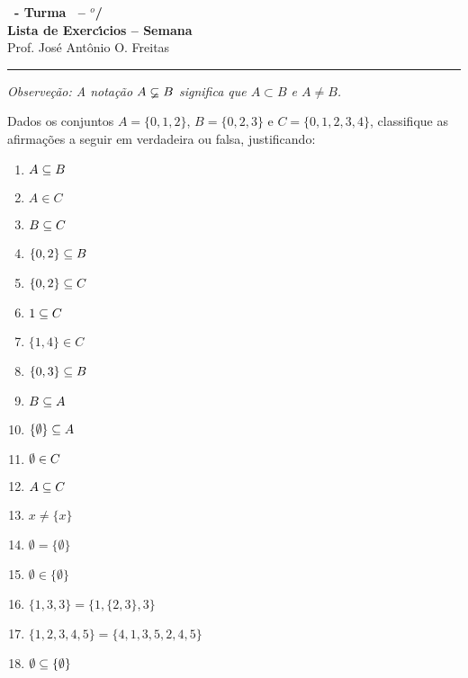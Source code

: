 \documentclass[12pt]{exam}
\begin{document}
    \begin{center}
    {\Large\bf \disciplina\ - Turma \turma\ -- \semestre$^{o}$/\ano} \\ \vspace{9pt} {\large\bf
        Lista de Exerc{\'\i}cios -- Semana \numerosemana}\\ \vspace{9pt} Prof. Jos{\'e} Ant{\^o}nio O. Freitas
    \end{center}
    \hrule

    \vspace{.6cm}

    \begin{center}
        \textit{Observeção: A notação $A \varsubsetneq B$ significa que $A \subset B$ e $A \ne B$.}
    \end{center}
    \questao{} Dados os conjuntos $A = \{0,1,2\}$, $B = \{0,2,3\}$ e $C = \{0,1,2,3,4\}$, classifique as afirma\c{c}\~oes a seguir em verdadeira ou falsa, justificando:
    \begin{multicols}{2}
        \begin{enumerate}[label={\alph*})]
            \item $A \subseteq B$
            \item $A \in C$
            \item $B \subseteq C$
            \item $\{0,2\} \subseteq B$
            \item $\{0,2\} \subseteq C$
            \item $1 \subseteq C$
            \item $\{1,4\} \in C$
            \item $\{0,3\} \subseteq B$
            \item $B \subseteq A$
            \item $\{\emptyset\} \subseteq A$
            \item $\emptyset \in C$
            \item $A \subseteq C$
            \item $x \neq \{x\}$
            \item $\emptyset = \{\emptyset\}$
            \item $\emptyset \in \{\emptyset\}$
            \item $\{1, 3, 3\} = \{1, \{2, 3\}, 3\}$
            \item $\{1, 2, 3, 4, 5\} = \{4, 1, 3, 5, 2, 4, 5\}$
            \item $\emptyset \subseteq \{\emptyset\}$
        \end{enumerate} 
    \end{multicols}
\end{document}

